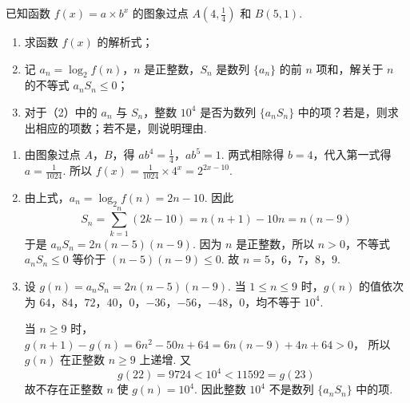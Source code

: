\begin{problem}
已知函数 \(f(x) = a \times b^x\) 的图象过点 \(A\left(4, \frac{1}{4}\right)\) 和 \(B(5,1)\).

\begin{enumerate}
\item 求函数 \(f(x)\) 的解析式；
\item 记 \(a_{n} = \log_{2}f(n)\)，\(n\) 是正整数，\(S_{n}\) 是数列 \(\{a_{n}\}\) 的前 \(n\) 项和，解关于 \(n\) 的不等式 \(a_{n}S_{n} \leqslant 0\)；
\item 对于（2）中的 \(a_{n}\) 与 \(S_{n}\)，整数 \(10^{4}\) 是否为数列 \(\{a_{n}S_{n}\}\) 中的项？若是，则求出相应的项数；若不是，则说明理由.
\end{enumerate}
\end{problem}

\begin{solution}
\begin{enumerate}
\item 由图象过点 \(A\)，\(B\)，得 \(ab^4=\frac{1}{4}\)，\(ab^5=1\).
两式相除得 \(b=4\)，代入第一式得 \(a=\frac{1}{1024}\). 所以
\(f(x)=\frac{1}{1024}\times4^x=2^{2x-10}\).

\item 由上式，\(a_n=\log_2f(n)=2n-10\).
因此
\[
S_n=\sum_{k=1}^{n}(2k-10)=n(n+1)-10n=n(n-9)
\]
于是
\(a_nS_n=2n(n-5)(n-9)\).
因为 \(n\) 是正整数，所以 \(n>0\)，不等式 \(a_nS_n\leqslant0\) 等价于
\((n-5)(n-9)\leqslant0\).
故 \(n=5\)，\(6\)，\(7\)，\(8\)，\(9\).

\item 设 \(g(n)=a_nS_n=2n(n-5)(n-9)\). 当 \(1\leqslant n\leqslant9\) 时，\(g(n)\) 的值依次为 \(64\)，\(84\)，\(72\)，\(40\)，\(0\)，\(-36\)，\(-56\)，\(-48\)，\(0\)，均不等于 \(10^4\).

当 \(n\geqslant9\) 时，
\(g(n+1)-g(n)=6n^2-50n+64=6n(n-9)+4n+64>0\)，
所以 \(g(n)\) 在正整数 \(n\geqslant9\) 上递增. 又
\[
g(22)=9724<10^4<11592=g(23)
\]
故不存在正整数 \(n\) 使 \(g(n)=10^4\). 因此整数 \(10^4\) 不是数列 \(\{a_nS_n\}\) 中的项.
\end{enumerate}
\end{solution}

